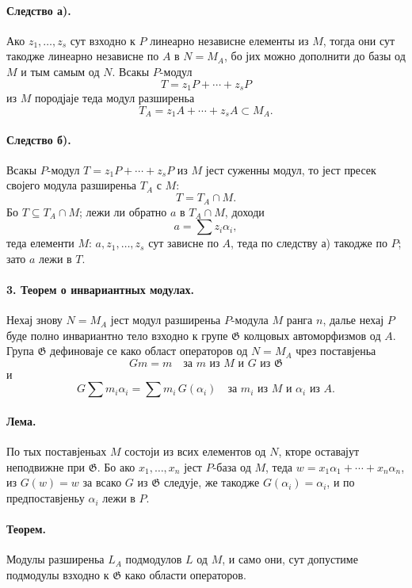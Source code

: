 ﻿\documentclass[11pt]{article}
\providecommand{\frG}{\mathfrak G}
\begin{document}
\paragraph{Следство а).}
Ако \(z_1,\ldots,z_s\) сут взходно к \(P\) линеарно независне елементы из \(M\), тогда они сут такодже линеарно независне по \(A\) в \(N=M_A\), бо јих можно дополнити до базы од \(M\) и тым самым од \(N\). Всакы \(P\)-модул
\[
        T=z_1P+\cdots+z_sP
\]
из \(M\) породјаје теда модул разширеньа
\[
        T_A=z_1A+\cdots+z_sA\subset M_A.
\]

\paragraph{Следство б).}
Всакы \(P\)-модул \(T=z_1P+\cdots+z_sP\) из \(M\) јест суженны модул, то јест пресек својего модула разширеньа \(T_A\) с \(M\):
\[
        T=T_A\cap M .
\]
Бо \(T\subseteq T_A\cap M\); лежи ли обратно \(a\) в \(T_A\cap M\), доходи
\[
        a=\sum z_i\alpha_i,
\]
теда елементи \(M\): \(a,z_1,\ldots,z_s\) сут зависне по \(A\), теда по следству а) такодже по \(P\); зато \(a\) лежи в \(T\).

\paragraph{3. Теорем о инвариантных модулах.}
Нехај знову \(N=M_A\) јест модул разширеньа \(P\)-модула \(M\) ранга \(n\), далье нехај \(P\) буде полно инвариантно тело взходно к групе \(\frG\) колцовых автоморфизмов од \(A\). Група \(\frG\) дефиноваје се како област операторов од \(N=M_A\) чрез поставјеньа
\[
        Gm=m\quad\text{за }m\text{ из }M\text{ и }G\text{ из }\frG
\]
и
\[
        G\sum m_i\alpha_i=\sum m_i\,G(\alpha_i)
        \quad\text{за }m_i\text{ из }M\text{ и }\alpha_i\text{ из }A.
\]

\paragraph{Лема.}
По тых поставјеньах \(M\) состоји из всих елементов од \(N\), кторе оставајут неподвижне при \(\frG\). Бо ако \(x_1,\ldots,x_n\) јест \(P\)-база од \(M\), теда \(w=x_1\alpha_1+\cdots+x_n\alpha_n\), из \(G(w)=w\) за всако \(G\) из \(\frG\) следује, же такодже \(G(\alpha_i)=\alpha_i\), и по предпоставјеньу \(\alpha_i\) лежи в \(P\).

\paragraph{Теорем.}
Модулы разширеньа \(L_A\) подмодулов \(L\) од \(M\), и само они, сут допустиме подмодулы взходно к \(\frG\) како области операторов.
\end{document}
